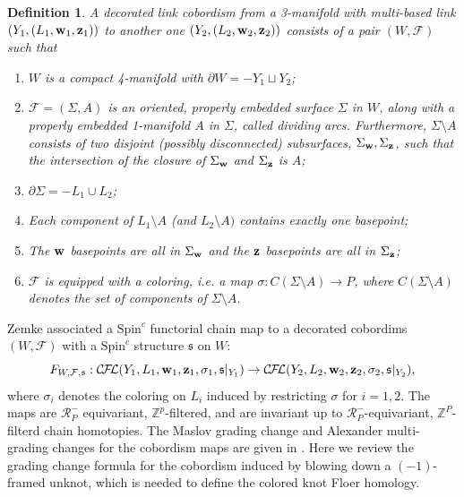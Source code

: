 \documentclass{amsart}
\newtheorem{definition}[theorem]{Definition}
\newcommand{\cCFL}{\mathcal{C\!F\!L}}
\newcommand{\s}{\mathfrak{s}}
\newcommand{\Spin}{\text{Spin}^{c}}
\newcommand{\w}{\mathbf{w}}
\def\w{{\bf{w}}}
\def\z{{\bf{z}}}
\newcommand{\Z}{\mathbb{Z}}
\begin{document}
\begin{definition}\cite[Definition 1.3]{Zemke2}
A decorated link cobordism from a 3-manifold with multi-based link $(Y_1, (L_1, \w_1, \z_1))$ to another one $(Y_2, (L_2, \w_2, \z_2))$ consists of a pair $(W, \mathcal{F})$ such that 
\begin{enumerate}
    \item $W$ is a compact 4-manifold with $\partial W=-Y_1\sqcup Y_2$; 
    \item $\mathcal{F}=(\Sigma, A)$ is an oriented, properly embedded surface $\Sigma$ in $W$, along with a properly embedded 1-manifold $A$ in $\Sigma$, called \emph{dividing arcs}. Furthermore, $\Sigma\setminus A$ consists of two disjoint (possibly disconnected) subsurfaces, $\Sigma_\w, \Sigma_\z$, such that the intersection of the closure of $\Sigma_\w$ and $\Sigma_\z$ is $A$; 
    \item $\partial \Sigma=-L_1\cup L_2$; 
    \item Each component of $L_1\setminus A$ (and $L_2\setminus A)$ contains exactly one basepoint;
    \item The $\w$ basepoints are all in $\Sigma_\w$ and the $\z$ basepoints are all in $\Sigma_\z$;
    \item $\mathcal{F}$ is equipped with a coloring, i.e. a map $\sigma: C(\Sigma\setminus A)\rightarrow P$, where $C(\Sigma\setminus A)$ denotes the set of components of $\Sigma\setminus A$. 

\end{enumerate}
    
\end{definition}

Zemke \cite[Theorem A]{Zemke} associated a $\Spin$ functorial chain map to a decorated cobordims $(W, \mathcal{F})$ with a $\Spin$ structure $\s$ on $W$:
$$F_{W, \mathcal{F}, \s}: \cCFL(Y_1, L_1, \w_1, \z_1, \sigma_1, \s|_{Y_1})\rightarrow \cCFL(Y_2, L_2, \w_2, \z_2, \sigma_2, \s|_{Y_2}),$$
where $\sigma_i$ denotes the coloring on $L_i$ induced by restricting $\sigma$ for $i=1, 2$. The maps are $\mathcal{R}_P^-$ equivariant, $\Z^p$-filtered, and are invariant up to $\mathcal{R}_P^-$-equivariant, $\Z^P$-filterd chain homotopies. The Maslov grading change and Alexander multi-grading changes for the cobordism maps are given in \cite[Theorem 1.4]{Zemke2}. Here we review the grading change formula for the cobordism induced by blowing down a $(-1)$-framed unknot, which is needed to define the colored knot Floer homology. 
\end{document}

